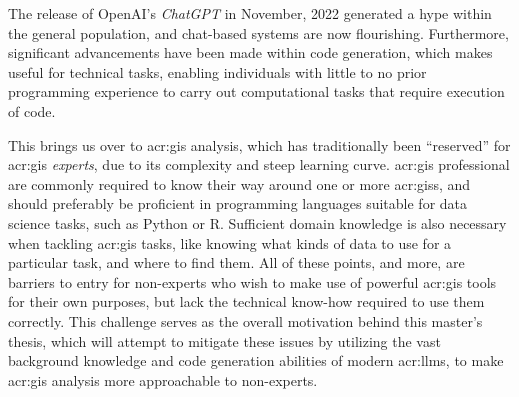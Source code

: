 \begin{comment}
Having a template to work from provides a starting point.
However, for a given project, a slight variation in the template may be required due to the nature of the given project.
Furthermore, the order in which the various chapters and sections will be written will also vary from project to project,
but the writing will seldom start at the abstract and sequentially follow the chapters of the report.
One critical reason for this is that you need to start writing as early as possible and that you will begin to write up where you are currently focusing.
However, do not leave working on the abstract until the very last days. The abstract is the first thing anyone reads of an article or thesis --- after the title;
and thus it is important that it is very well written. Abstracts are hard to write, so create revisions throughout the course of your project.

The background and motivation here should state where your project is situated in the field and what the key driving forces motivating this research are.
However, keep this section brief, as it is still part of the introduction.
The motivation will be further elaborated on in Chapter~\ref{cha:related_work}, presenting your complete state-of-the-art.

Note that this template uses italics to highlight where Latin wording is inserted to represent text and the text of the template
that we wish to draw your attention to. The italics themselves are not an indication that such sections should use italics.

\end{comment}

The release of OpenAI's \textit{ChatGPT} in November, 2022 \citep{openaiIntroducingChatGPT2022} generated a hype within the general population, and chat-based systems are now flourishing. Furthermore, significant advancements have been made within code generation, which makes  useful for technical tasks, enabling individuals with little to no prior programming experience to carry out computational tasks that require execution of code.

This brings us over to \gls{acr:gis} analysis, which has traditionally been \enquote{reserved} for \acrshort{acr:gis} \textit{experts}, due to its complexity and steep learning curve. \acrshort{acr:gis} professional are commonly required to know their way around one or more \glspl{acr:gis}, and should preferably be proficient in programming languages suitable for data science tasks, such as Python or R. Sufficient domain knowledge is also necessary when tackling \acrshort{acr:gis} tasks, like knowing what kinds of data to use for a particular task, and where to find them. All of these points, and more, are barriers to entry for non-experts who wish to make use of powerful \acrshort{acr:gis} tools for their own purposes, but lack the technical know-how required to use them correctly. This challenge serves as the overall motivation behind this master's thesis, which will attempt to mitigate these issues by utilizing the vast background knowledge and code generation abilities of modern \glspl{acr:llm}, to make \acrshort{acr:gis} analysis more approachable to non-experts.

